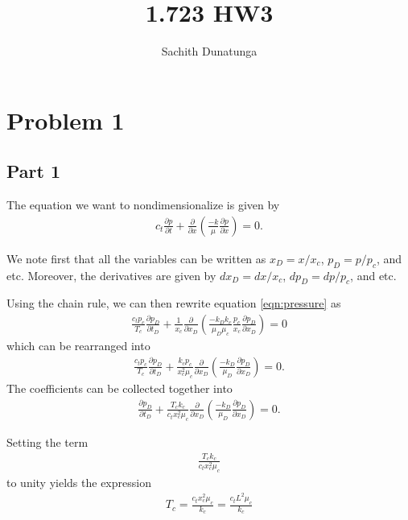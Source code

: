 \documentclass{article}
\title{1.723 HW3}
\author{Sachith  Dunatunga}
\begin{document}
\maketitle

\section{Problem 1}
\subsection{Part 1}
The equation we want to nondimensionalize is given by
\begin{align}
    c_t \frac{\partial p}{\partial t} + \frac{\partial}{\partial x} \left( \frac{-k}{\mu} \frac{\partial p}{\partial x} \right) = 0.
    \label{eqn:pressure}
\end{align}

We note first that all the variables can be written as $x_D = x / x_c$, $p_D = p / p_c$, and etc.
Moreover, the derivatives are given by $dx_D = dx / x_c$, $dp_D = dp / p_c$, and etc.

Using the chain rule, we can then rewrite equation \eqref{eqn:pressure} as
\begin{align}
    \frac{c_t p_c}{T_c} \frac{\partial p_D}{\partial t_D} + \frac{1}{x_c} \frac{\partial}{\partial x_D} \left( \frac{-k_D k_c}{\mu_D \mu_c} \frac{p_c}{x_c} \frac{\partial p_D}{\partial x_D} \right) = 0
\end{align}
which can be rearranged into
\begin{align}
    \frac{c_t p_c}{T_c} \frac{\partial p_D}{\partial t_D} + \frac{k_c p_c}{x_c^2 \mu_c} \frac{\partial}{\partial x_D} \left( \frac{-k_D}{\mu_D}\frac{\partial p_D}{\partial x_D} \right) = 0.
\end{align}
The coefficients can be collected together into
\begin{align}
    \frac{\partial p_D}{\partial t_D} + \frac{T_c k_c}{c_t x_c^2 \mu_c} \frac{\partial}{\partial x_D} \left( \frac{-k_D}{\mu_D}\frac{\partial p_D}{\partial x_D} \right) = 0.
\end{align}

Setting the term
\begin{align}
    \frac{T_c k_c}{c_t x_c^2 \mu_c}
\end{align}
to unity yields the expression
\begin{align}
    T_c = \frac{c_t x_c^2 \mu_c}{k_c} = \frac{c_t L^2 \mu_c}{k_c}
\end{align}
\end{document}
